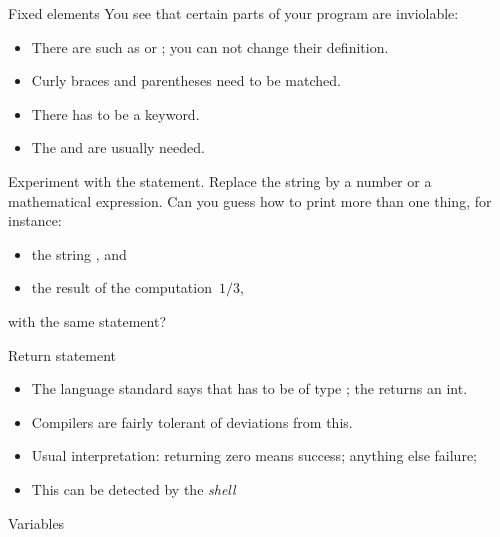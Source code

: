 \begin{block}{Fixed elements}
  \label{sl:fixedstuff}
  You see that certain parts of your program are inviolable:
  \begin{itemize}
  \item There are  such as  or ; you
    can not change their definition.
  \item Curly braces and parentheses need to be matched.
  \item There has to be a  keyword.
  \item The  and  are usually needed.
  \end{itemize}
\end{block}

\begin{exercise}
  \label{ex:cout-what}
  Experiment with the  statement. Replace the string by a
  number or a mathematical expression. Can you guess how to print more
  than one thing, for instance:
  \begin{itemize}
  \item the string , and
  \item the result of the computation~$1/3$,     
  \end{itemize}
  with the same  statement?
\end{exercise}

\begin{block}{Return statement}
  \begin{itemize}
  \item The language standard says that  has to be of type
    ; the  returns an int.
  \item Compilers are fairly tolerant of deviations from this.
  \item Usual interpretation: returning zero means success; anything else failure;
  \item This  can be detected by the
    \emph{shell}
  \end{itemize}
\end{block}

 {Variables}
\label{sec:variables}

